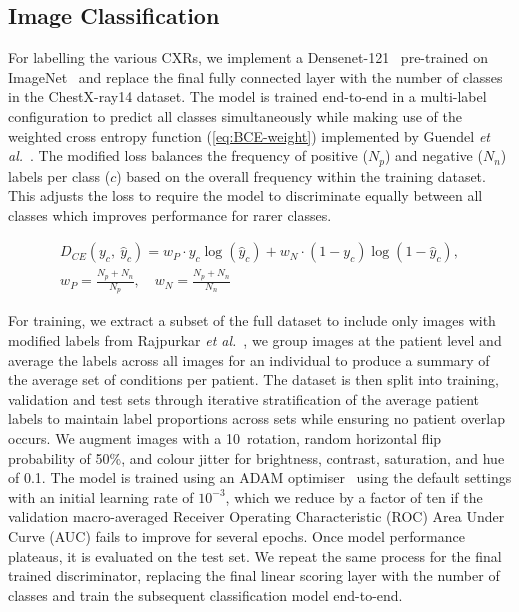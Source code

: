 \documentclass{article}
\begin{document}
\subsection{Image Classification}
\label{sec:classifier-train}
For labelling the various CXRs, we implement a Densenet-121~\cite{huangDenselyConnectedConvolutional2018} pre-trained on ImageNet~\cite{russakovskyImageNetLargeScale2015} and replace the final fully connected layer with the number of classes in the ChestX-ray14 dataset. The model is trained end-to-end in a multi-label configuration to predict all classes simultaneously while making use of the weighted cross entropy function (\ref{eq:BCE-weight}) implemented by Guendel \emph{et al.}~\cite{guendelLearningRecognizeAbnormalities2018}. The modified loss balances the frequency of positive ($N_p$) and negative ($N_n$) labels per class ($c$) based on the overall frequency within the training dataset. This adjusts the loss to require the model to discriminate equally between all classes which improves performance for rarer classes.

\begin{equation} \label{eq:BCE-weight}
\begin{split}
D_{CE}(y_c,\ \hat{y}_c) = w_P \cdot y_c \log(\hat{y}_c) + w_N \cdot (1 - y_c) \log(1 - \hat{y}_c),  \\
w_P = \frac{N_p + N_n}{N_p}, \quad
w_N = \frac{N_p + N_n}{N_n}
\end{split}
\end{equation}

For training, we extract a subset of the full dataset to include only images with modified labels from Rajpurkar \emph{et al.}~\cite{rajpurkarDeepLearningChest2018}, we group images at the patient level and average the labels across all images for an individual to produce a summary of the average set of conditions per patient. The dataset is then split into training, validation and test sets through iterative stratification of the average patient labels to maintain label proportions across sets while ensuring no patient overlap occurs. We augment images with a 10\textdegree \ rotation, random horizontal flip probability of 50\%, and colour jitter for brightness, contrast, saturation, and hue of \num{0.1}. The model is trained using an ADAM optimiser~\cite{kingmaAdamMethodStochastic2015} using the default settings with an initial learning rate of $10^{-3}$, which we reduce by a factor of ten if the validation macro-averaged Receiver Operating Characteristic (ROC) Area Under Curve (AUC) fails to improve for several epochs. Once model performance plateaus, it is evaluated on the test set. We repeat the same process for the final trained discriminator, replacing the final linear scoring layer with the number of classes and train the subsequent classification model end-to-end.
\end{document}
